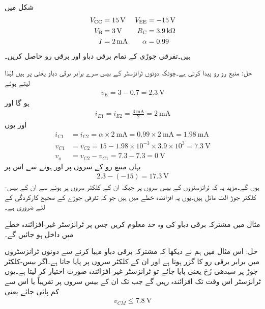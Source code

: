  
شکل  میں 
\begin{align*}
V_{\textup{CC}} &=\SI{+15}{\volt} & V_{\textup{EE}} &=\SI{-15}{\volt} \\
V_{\textup{B}} &=\SI{3}{\volt} &  R_{\textup{C}} &=\SI{3.9}{\kilo \ohm}\\
I &=\SI{2}{\milli \ampere} & \alpha &=\num{0.99}
\end{align*}
ہیں۔تفرقی جوڑی کے تمام برقی دباو اور برقی رو حاصل کریں۔

حل:	منبع رو  رو پیدا کرتی ہے۔چونکہ دونوں ٹرانزسٹر کے بیس  سرے برابر برقی دباو یعنی   پر ہیں لہٰذا   لیتے ہوئے
\begin{align*}
v_E=3-0.7=\SI{2.3}{\volt}
\end{align*}
ہو گا اور
\begin{align*}
i_{E1}=i_{E2}=\frac{\SI{4}{\milli \ampere}}{2}=\SI{2}{\milli \ampere}
\end{align*}
اور یوں
\begin{align*}
i_{C1}&=i_{C2}=\alpha \times \SI{2}{\milli \ampere}=0.99 \times \SI{2}{\milli \ampere}=\SI{1.98}{\milli \ampere}\\
v_{C1}&=v_{C2}=15-1.98\times 10^{-3} \times 3.9 \times 10^3=\SI{7.3}{\volt}\\
v_o&=v_{C2}-v_{C1}=7.3-7.3=\SI{0}{\volt}
\end{align*}
یہاں منبع رو کے سروں پر   اور  ہونے سے اس پر 
\begin{align*}
2.3-(-15)=\SI{17.3}{\volt}
\end{align*}
ہوں گے۔مزید یہ کہ ٹرانزسٹروں کے بیس  سروں پر  جبکہ ان کے کلکٹر سروں پر  ہونے سے ان کے بیس-کلکٹر  جوڑ الٹ مائل ہیں۔یوں یہ افزائندہ خطے میں ہیں جو کہ تفرقی جوڑے کے صحیح کارکردگی کے لئے ضروری ہے۔


مثال   میں مشترکہ برقی دباو کی وہ حد معلوم کریں جس پر ٹرانزسٹر غیر-افزائندہ خطے میں داخل ہو جائیں گے۔

حل:	اس مثال میں ہم نے دیکھا کہ مشترکہ برقی دباو مہیا کرنے سے دونوں ٹرانزسٹروں میں برابر برقی رو کا گزر ہوتا ہے اور ان کے کلکٹر سروں پر  پایا جاتا ہے۔اگر بیس-کلکٹر  جوڑ پر سیدھی رُخ  یعنی  پایا جائے تو ٹرانزسٹر غیر-افزائندہ صورت اختیار کر لیتا ہے۔یوں ٹرانزسٹر اس وقت تک افزائندہ رہیں گے جب تک ان کے بیس  سروں پر تقریباً  یا اس سے کم  پائی جائے  یعنی
\begin{align*}
v_{CM}\le \SI{7.8}{\volt}
\end{align*}

